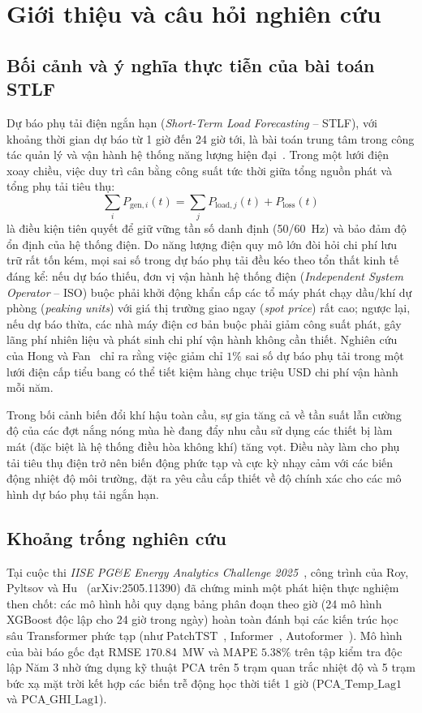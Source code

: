 \section{Giới thiệu và câu hỏi nghiên cứu}
\label{sec:introduction}

\subsection{Bối cảnh và ý nghĩa thực tiễn của bài toán STLF}
Dự báo phụ tải điện ngắn hạn (\textit{Short-Term Load Forecasting} -- STLF), với khoảng thời gian dự báo từ 1 giờ đến 24 giờ tới, là bài toán trung tâm trong công tác quản lý và vận hành hệ thống năng lượng hiện đại~\cite{hong2016probabilistic}. Trong một lưới điện xoay chiều, việc duy trì cân bằng công suất tức thời giữa tổng nguồn phát và tổng phụ tải tiêu thụ:
\begin{equation}
    \sum_{i} P_{\text{gen}, i}(t) = \sum_{j} P_{\text{load}, j}(t) + P_{\text{loss}}(t)
\end{equation}
là điều kiện tiên quyết để giữ vững tần số danh định (50/60~Hz) và bảo đảm độ ổn định của hệ thống điện. Do năng lượng điện quy mô lớn đòi hỏi chi phí lưu trữ rất tốn kém, mọi sai số trong dự báo phụ tải đều kéo theo tổn thất kinh tế đáng kể: nếu dự báo thiếu, đơn vị vận hành hệ thống điện (\textit{Independent System Operator} -- ISO) buộc phải khởi động khẩn cấp các tổ máy phát chạy dầu/khí dự phòng (\textit{peaking units}) với giá thị trường giao ngay (\textit{spot price}) rất cao; ngược lại, nếu dự báo thừa, các nhà máy điện cơ bản buộc phải giảm công suất phát, gây lãng phí nhiên liệu và phát sinh chi phí vận hành không cần thiết. Nghiên cứu của Hong và Fan~\cite{hong2016probabilistic} chỉ ra rằng việc giảm chỉ $1\%$ sai số dự báo phụ tải trong một lưới điện cấp tiểu bang có thể tiết kiệm hàng chục triệu USD chi phí vận hành mỗi năm.

Trong bối cảnh biến đổi khí hậu toàn cầu, sự gia tăng cả về tần suất lẫn cường độ của các đợt nắng nóng mùa hè đang đẩy nhu cầu sử dụng các thiết bị làm mát (đặc biệt là hệ thống điều hòa không khí) tăng vọt. Điều này làm cho phụ tải tiêu thụ điện trở nên biến động phức tạp và cực kỳ nhạy cảm với các biến động nhiệt độ môi trường, đặt ra yêu cầu cấp thiết về độ chính xác cho các mô hình dự báo phụ tải ngắn hạn.

\subsection{Khoảng trống nghiên cứu}
Tại cuộc thi \textit{IISE PG\&E Energy Analytics Challenge 2025}~\cite{pge2025zenodo}, công trình của Roy, Pyltsov và Hu~\cite{roy2025hourly} (arXiv:2505.11390) đã chứng minh một phát hiện thực nghiệm then chốt: các mô hình hồi quy dạng bảng phân đoạn theo giờ (24 mô hình XGBoost độc lập cho 24 giờ trong ngày) hoàn toàn đánh bại các kiến trúc học sâu Transformer phức tạp (như PatchTST~\cite{nie2023time}, Informer~\cite{zhou2021informer}, Autoformer~\cite{wu2021autoformer}). Mô hình của bài báo gốc đạt RMSE $170.84$~MW và MAPE $5.38\%$ trên tập kiểm tra độc lập Năm 3 nhờ ứng dụng kỹ thuật PCA trên 5 trạm quan trắc nhiệt độ và 5 trạm bức xạ mặt trời kết hợp các biến trễ động học thời tiết 1 giờ ($\text{PCA\_Temp\_Lag1}$ và $\text{PCA\_GHI\_Lag1}$).

